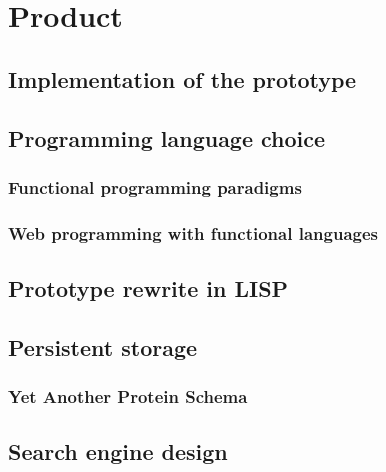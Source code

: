 \chapter{Product}\label{chap:product}

\section{Implementation of the prototype}

\section{Programming language choice}


\subsection{Functional programming paradigms}


\subsection{Web programming with functional languages}


\section{Prototype rewrite in LISP}

\section{Persistent storage}
\subsection{Yet Another Protein Schema}

\section{Search engine design}



